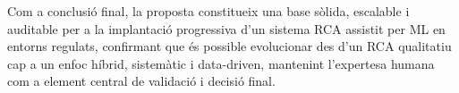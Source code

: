 Com a conclusió final, la proposta constitueix una base sòlida, escalable i auditable per a la implantació progressiva d'un sistema RCA assistit per ML en entorns regulats, confirmant que és possible evolucionar des d'un RCA qualitatiu cap a un enfoc híbrid, sistemàtic i data-driven, mantenint l'expertesa humana com a element central de validació i decisió final.
